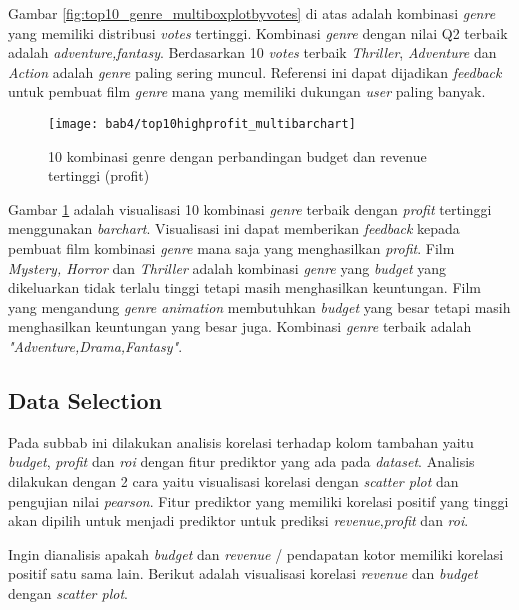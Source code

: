 Gambar \ref{fig:top10_genre_multiboxplotbyvotes} di atas adalah kombinasi \textit{genre} yang memiliki distribusi \textit{votes} tertinggi. Kombinasi \textit{genre} dengan nilai Q2 terbaik adalah \textit{adventure,fantasy}. Berdasarkan 10 \textit{votes} terbaik \textit{Thriller}, \textit{Adventure} dan \textit{Action} adalah \textit{genre} paling sering muncul. Referensi ini dapat dijadikan \textit{feedback} untuk pembuat film \textit{genre} mana yang memiliki dukungan \textit{user} paling banyak. 


\begin{figure}[H]
	\centering  
	\texttt{[image: bab4/top10highprofit\_multibarchart]}   
	\caption{10 kombinasi genre dengan perbandingan budget dan revenue tertinggi (profit) }
	\label{fig:top10highprofit_multibarchart} 
\end{figure} 

Gambar \ref{fig:top10highprofit_multibarchart} adalah visualisasi 10 kombinasi \textit{genre} terbaik dengan \textit{profit} tertinggi menggunakan \textit{barchart}. Visualisasi ini dapat memberikan \textit{feedback} kepada pembuat film kombinasi \textit{genre} mana saja yang menghasilkan \textit{profit}. Film \textit{Mystery, Horror} dan \textit{Thriller} adalah kombinasi \textit{genre} yang \textit{budget} yang dikeluarkan tidak terlalu tinggi tetapi masih menghasilkan keuntungan. Film yang mengandung \textit{genre animation} membutuhkan \textit{budget} yang besar tetapi masih menghasilkan keuntungan yang besar juga. Kombinasi \textit{genre} terbaik adalah \textit{"Adventure,Drama,Fantasy"}.

\subsection{Data Selection} 
\label{chap:hasiltambahandataselection}
Pada subbab ini dilakukan analisis korelasi terhadap kolom tambahan yaitu \textit{budget}, \textit{profit} dan \textit{roi} dengan fitur prediktor yang ada pada \textit{dataset}. Analisis dilakukan dengan 2 cara yaitu visualisasi korelasi dengan \textit{scatter plot} dan pengujian nilai \textit{pearson}. Fitur prediktor yang memiliki korelasi positif yang tinggi akan dipilih untuk menjadi prediktor untuk prediksi \textit{revenue},\textit{profit} dan \textit{roi}. 

Ingin dianalisis apakah \textit{budget} dan \textit{revenue} / pendapatan kotor memiliki korelasi positif satu sama lain. Berikut adalah visualisasi korelasi \textit{revenue} dan \textit{budget} dengan \textit{scatter plot}. 


